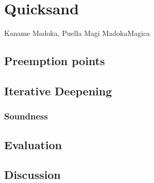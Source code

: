 \chapter{Quicksand}
\label{chap:quicksand}
{Kaname Madoka, Puella Magi Madoka{\raisebox{0.1em}{$\scriptstyle \bigstar$}}Magica}


\section{Preemption points} %
\label{sec:quicksand-pps}

\section{Iterative Deepening}
\label{sec:quicksand-id}

\subsection{Soundness}
\label{sec:quicksand-soundness}


\section{Evaluation}
\label{sec:quicksand-eval}

\section{Discussion}
\label{sec:quicksand-discussion}
